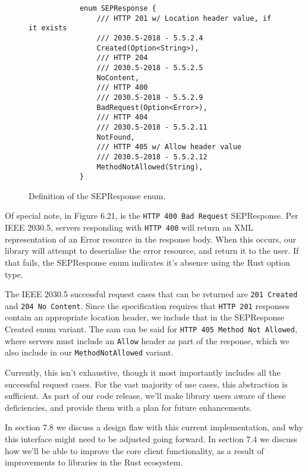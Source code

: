 \begin{figure}[h]
    \begin{center}
        \begin{lstlisting}
            enum SEPResponse {
                /// HTTP 201 w/ Location header value, if it exists
                /// 2030.5-2018 - 5.5.2.4
                Created(Option<String>),
                /// HTTP 204
                /// 2030.5-2018 - 5.5.2.5
                NoContent,
                /// HTTP 400 
                /// 2030.5-2018 - 5.5.2.9
                BadRequest(Option<Error>),
                /// HTTP 404 
                /// 2030.5-2018 - 5.5.2.11
                NotFound,
                /// HTTP 405 w/ Allow header value 
                /// 2030.5-2018 - 5.5.2.12
                MethodNotAllowed(String),
            }
        \end{lstlisting}
        \label{fig:sepresponse}
        \vspace{-10pt}
        \caption{Definition of the SEPResponse enum.}
    \end{center}
\end{figure}

Of special note, in Figure 6.21, is the \texttt{HTTP 400 Bad Request} SEPResponse. Per IEEE 2030.5, servers responding with \texttt{HTTP 400} will return an XML representation of an Error resource in the response body. When this occurs, our library will attempt to deserialise the error resource, and return it to the user. If that fails, the SEPResponse enum indicates it's absence using the Rust option type.

The IEEE 2030.5 successful request cases that can be returned are \texttt{201 Created} and \texttt{204 No Content}. Since the specification requires that \texttt{HTTP 201} responses contain an appropriate location header, we include that in the SEPResponse Created enum variant. The sam can be said for \texttt{HTTP 405 Method Not Allowed}, where servers must include an \texttt{Allow} header as part of the response, which we also include in our \texttt{MethodNotAllowed} variant.

Currently, this isn't exhaustive, though it most importantly includes all the successful request cases. For the vast majority of use cases, this abstraction is sufficient. As part of our code release, we'll make library users aware of these deficiencies, and provide them with a plan for future enhancements.

In section 7.8 we discuss a design flaw with this current implementation, and why this interface might need to be adjusted going forward. In section 7.4 we discuss how we'll be able to improve the core client functionality, as a result of improvements to libraries in the Rust ecosystem.


